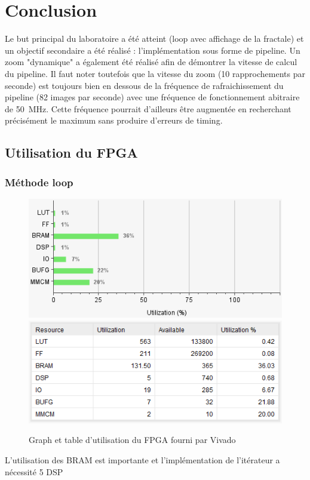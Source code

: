\documentclass[LPSC_Labo03_SDeriaz]{subfiles}
\begin{document}
\section{Conclusion}
Le but principal du laboratoire a été atteint (loop avec affichage de la fractale) et un objectif secondaire a été réalisé : l'implémentation sous forme de pipeline. Un zoom "dynamique" a également été réalisé afin de démontrer la vitesse de calcul du pipeline. Il faut noter toutefois que la vitesse du zoom (10 rapprochements par seconde) est toujours bien en dessous de la fréquence de rafraichissement du pipeline (82 images par seconde) avec une fréquence de fonctionnement abitraire de \SI{50}{\mega\hertz}. Cette fréquence pourrait d'ailleurs être augmentée en recherchant précisément le maximum sans produire d'erreurs de timing.
\subsection{Utilisation du FPGA}
\subsubsection{Méthode loop}
\begin{figure}[H]
\centering
\includegraphics[scale=0.5]{utilisation_graph_loop.png}
\includegraphics[scale=0.5]{utilisation_table_loop.png}
\caption{Graph et table d'utilisation du FPGA fourni par Vivado}
\end{figure}
L'utilisation des BRAM est importante et l'implémentation de l'itérateur a nécessité 5 DSP
\end{document}
